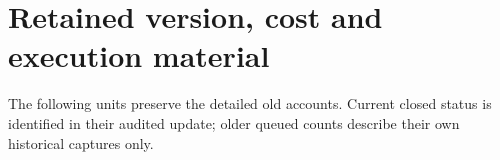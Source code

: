 \section{Retained version, cost and execution material}
The following units preserve the detailed old accounts. Current closed
status is identified in their audited update; older queued counts describe
their own historical captures only.



